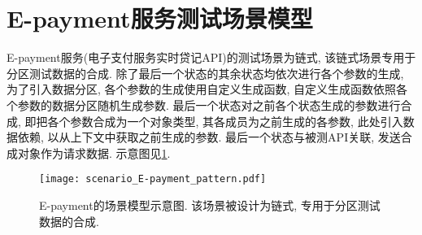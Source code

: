     \section{E-payment服务测试场景模型}
        \label{sec:epayment_scenario_model}
    
        E-payment服务(电子支付服务实时贷记API)的测试场景为链式, 该链式场景专用于分区测试数据的合成. 除了最后一个状态的其余状态均依次进行各个参数的生成, 为了引入数据分区, 各个参数的生成使用自定义生成函数, 自定义生成函数依照各个参数的数据分区随机生成参数. 最后一个状态对之前各个状态生成的参数进行合成, 即把各个参数合成为一个对象类型, 其各成员为之前生成的各参数, 此处引入数据依赖, 以从上下文中获取之前生成的参数. 最后一个状态与被测API关联, 发送合成对象作为请求数据. 示意图见\ref{fig:epayment_scenario}.
        
        \begin{figure}[!htb]
            \centering
            \texttt{[image: scenario\_E-payment\_pattern.pdf]}
            \caption{E-payment的场景模型示意图. 该场景被设计为链式, 专用于分区测试数据的合成.}
            \label{fig:epayment_scenario}
        \end{figure}
        